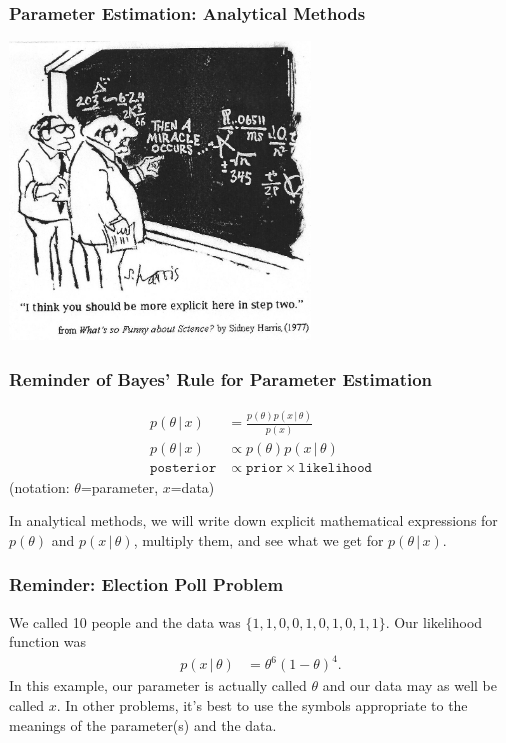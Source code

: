 \documentclass{beamer}
\newcommand{\given}{\,|\,}
\begin{document}
\begin{frame}
\frametitle{Parameter Estimation: Analytical Methods}

\begin{center}
\includegraphics[width=0.6\textwidth]{images/miracle.jpg}
\end{center}

\end{frame}

\begin{frame}
\frametitle{Reminder of Bayes' Rule for Parameter Estimation}

\begin{align}
p(\theta \given x) &= \frac{p(\theta)p(x \given \theta)}{p(x)} \\
p(\theta \given x) &\propto p(\theta)p(x \given \theta) \\
\texttt{posterior} &\propto \texttt{prior} \times \texttt{likelihood}
\end{align}
(notation: $\theta$=parameter, $x$=data)\pause

In analytical methods, we will write down explicit mathematical expressions
for $p(\theta)$ and $p(x \given \theta)$, multiply them, and see what we
get for $p(\theta \given x)$.

\end{frame}


\begin{frame}
\frametitle{Reminder: Election Poll Problem}
We called 10 people and the data was
$\{1, 1, 0, 0, 1, 0, 1, 0, 1, 1\}$. Our likelihood function was
\begin{align}
p(x \given \theta) &= \theta^6(1-\theta)^4.
\end{align}
\pause
In this example, our parameter is actually called $\theta$ and our data may
as well be called $x$. In other problems, it's best to use the symbols
appropriate to the meanings of the parameter(s) and the data.
\end{frame}
\end{document}
